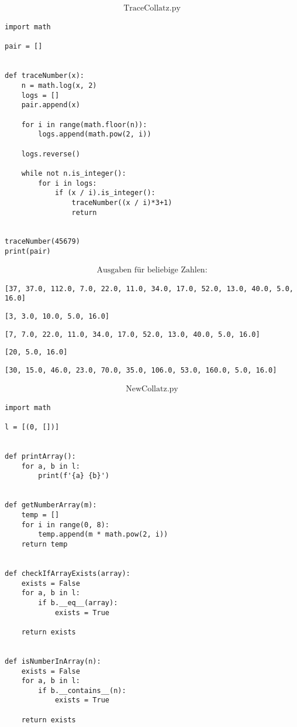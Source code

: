 \documentclass{article}
\begin{document}
\begin{gather*}
\text {TraceCollatz.py}
\end{gather*}
\begin{verbatim}
import math

pair = []


def traceNumber(x):
    n = math.log(x, 2)
    logs = []
    pair.append(x)

    for i in range(math.floor(n)):
        logs.append(math.pow(2, i))

    logs.reverse()

    while not n.is_integer():
        for i in logs:
            if (x / i).is_integer():
                traceNumber((x / i)*3+1)
                return


traceNumber(45679)
print(pair)
\end{verbatim}
\begin{gather*}
\text {Ausgaben für beliebige Zahlen:}
\end{gather*}
\begin{verbatim}
[37, 37.0, 112.0, 7.0, 22.0, 11.0, 34.0, 17.0, 52.0, 13.0, 40.0, 5.0, 16.0]
\end{verbatim}
\begin{verbatim}
[3, 3.0, 10.0, 5.0, 16.0]
\end{verbatim}
\begin{verbatim}
[7, 7.0, 22.0, 11.0, 34.0, 17.0, 52.0, 13.0, 40.0, 5.0, 16.0]
\end{verbatim}
\begin{verbatim}
[20, 5.0, 16.0]
\end{verbatim}
\begin{verbatim}
[30, 15.0, 46.0, 23.0, 70.0, 35.0, 106.0, 53.0, 160.0, 5.0, 16.0]
\end{verbatim}
\newpage
\begin{gather*}
\text {NewCollatz.py}
\end{gather*}
\begin{verbatim}
import math

l = [(0, [])]


def printArray():
    for a, b in l:
        print(f'{a} {b}')


def getNumberArray(m):
    temp = []
    for i in range(0, 8):
        temp.append(m * math.pow(2, i))
    return temp


def checkIfArrayExists(array):
    exists = False
    for a, b in l:
        if b.__eq__(array):
            exists = True

    return exists


def isNumberInArray(n):
    exists = False
    for a, b in l:
        if b.__contains__(n):
            exists = True

    return exists
\end{verbatim}
\end{document}
